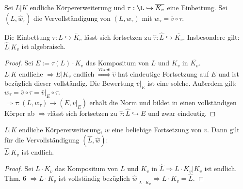 \begin{Prop}
Sei $L|K$ endliche Körpererweiterung und $\tau: \L \hookrightarrow \overline{K_v}$ eine Einbettung. Sei $(\hat{L}, \hat{w}_\tau)$ die Vervollständigung von $(L, w_\tau)$ mit $w_\tau = \overline{v} \circ \tau$.

Die Einbettung $\tau : L \hookrightarrow \overleftarrow{K_v}$ lässt sich fortsetzen zu $\hat{\tau}: \hat{L} \hookrightarrow \overline{K_v}$. Insbesondere gilt: $\hat{L}|K_v$ ist algebraisch.
\end{Prop} 

\begin{proof}


Sei $E:= \tau(L) \cdot K_v$ das Kompositum von $L$ und $K_v$ in $\overline{K_v}$.\\
$L|K$ endliche $\Rightarrow E|K_v$ endlich $\stackrel{Thm 6}{\Rightarrow} \hat{v}$ hat eindeutige Fortsetzung auf $E$ und ist bezüglich dieser vollständig. Die Bewertung $\overline{v}|_E$ ist eine solche. Außerdem gilt: $w_\tau = \overline{v} \circ \tau = \overline{v}|_E \circ \tau.$\\
$\Rightarrow \tau : (L, w_\tau) \to (E, \overline{v}|_E)$ erhält die Norm und bildet in einen vollständigen Körper ab $\Rightarrow \tau $lässt sich fortsetzen zu $\hat{\tau}: \hat{L} \hookrightarrow E$ und zwar eindeutig.
\end{proof}

\begin{Prop}
$L|K$ endliche Körpererweiterung, $w$ eine beliebige Fortsetzung von $v$. Dann gilt für die Vervollständigung $(\hat{L}, \hat{w})$:\\
$\hat{L}|K_v$ ist endlich.
\end{Prop}

\begin{proof}
Sei $L \cdot K_v$ das Kompositum von $L$ und $K_v$ in $\hat{L} \Rightarrow L \cdot K_v | K_v$ ist endlich.\\
Thm. 6 $\Rightarrow L \cdot K_v$ ist vollständig bezüglich $\hat{w}|_{L\cdot K_v} \Rightarrow L \cdot K_v = \hat{L}$.
\end{proof}

